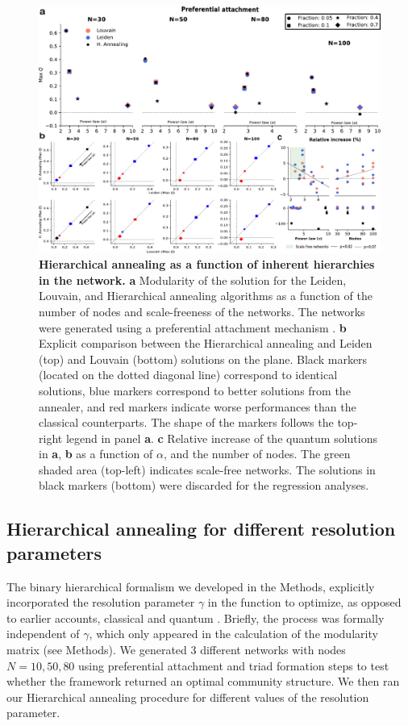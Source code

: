 \documentclass[pdflatex,sn-mathphys-num]{sn-jnl}%
\begin{document}
\begin{figure}
    \centering
    \includegraphics[width=1\linewidth]{Figures/Fig3.pdf}
    \caption{\textbf{Hierarchical annealing as a function of inherent hierarchies in the network.} \textbf{a} Modularity of the solution for the Leiden, Louvain, and Hierarchical annealing algorithms as a function of the number of nodes and scale-freeness of the networks. The networks were generated using a preferential attachment mechanism \cite{Barabasi1999}. \textbf{b} Explicit comparison between the Hierarchical annealing and Leiden (top) and Louvain (bottom) solutions on the plane. Black markers (located on the dotted diagonal line) correspond to identical solutions, blue markers correspond to better solutions from the annealer, and red markers indicate worse performances than the classical counterparts. The shape of the markers follows the top-right legend in panel \textbf{a}. \textbf{c} Relative increase of the quantum solutions in \textbf{a}, \textbf{b} as a function of $\alpha$, and the number of nodes. The green shaded area (top-left) indicates scale-free networks. The solutions in black markers (bottom) were discarded for the regression analyses.}
    \label{fig:topology}
\end{figure}

\subsection*{Hierarchical annealing for different resolution parameters}

The binary hierarchical formalism we developed in the Methods, explicitly incorporated the resolution parameter $\gamma$ in the function to optimize, as opposed to earlier accounts, classical \cite{Newman2006,Leicht2008} and quantum \cite{Ushijima-Mwesigwa2017,Negre2020}. Briefly, the process was formally independent of $\gamma$, which only appeared in the calculation of the modularity matrix (see Methods). We generated 3 different networks with nodes $N=10, 50, 80$ using preferential attachment and triad formation steps to test whether the framework returned an optimal community structure. We then ran our Hierarchical annealing procedure for different values of the resolution parameter. 
\end{document}

